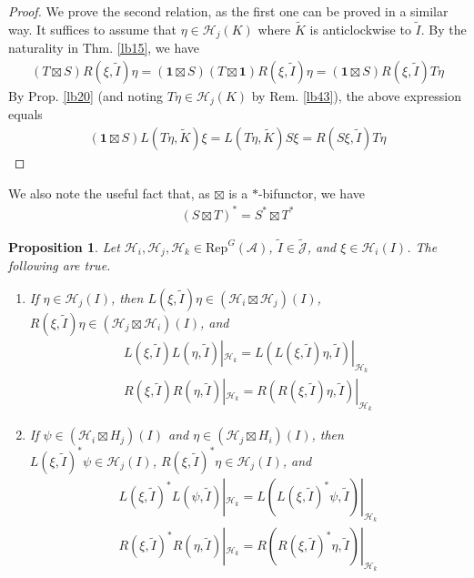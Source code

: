 \documentclass[11pt,b5paper,notitlepage]{article}
\theoremstyle{definition}
\theoremstyle{plain}
\newtheorem{pp}[df]{Proposition}
\newcommand{\mc}{\mathcal}
\newcommand{\wtd}{\widetilde}
\newcommand{\idt}{\mathbf{1}}
\newcommand{\RepGA}{\mathrm{Rep}^G(\mathcal A)}
\newcommand{\Jtd}{\widetilde{\mathcal J}}
\newcommand{\MH}{\mathcal H}
\numberwithin{equation}{section}
\begin{document}
\begin{proof}
We prove the second relation, as the first one can be proved in a similar way. It suffices to assume that $\eta\in\MH_j(K)$ where $\wtd K$ is anticlockwise to $\wtd I$. By the naturality in Thm. \ref{lb15}, we have
\begin{align*}
(T\boxtimes S)R(\xi,\wtd I)\eta=(\idt\boxtimes S)(T\boxtimes\idt)R(\xi,\wtd I)\eta=(\idt\boxtimes S)R(\xi,\wtd I)T\eta
\end{align*}
By Prop. \ref{lb20} (and noting $T\eta\in\MH_j(K)$ by Rem. \ref{lb43}), the above expression equals
\begin{align*}
(\idt\boxtimes S)L(T\eta,\wtd K)\xi=L(T\eta,\wtd K)S\xi=R(S\xi,\wtd I)T\eta
\end{align*}
\end{proof}


We also note the useful fact that, as $\boxtimes$ is a $*$-bifunctor, we have
\begin{align}\label{eq67}
(S\boxtimes T)^*=S^*\boxtimes T^*
\end{align}


\begin{pp}\label{lb21}
Let $\mc H_i,\mc H_j,\mc H_k\in\RepGA$, $\wtd I\in\Jtd$, and $\xi\in\mc H_i(I)$. The following are true.
\begin{enumerate}[label=(\alph*)]
\item If $\eta\in\mc H_j(I)$, then $L(\xi,\wtd I)\eta\in(\mc H_i\boxtimes\mc H_j)(I)$, $R(\xi,\wtd I)\eta\in(\mc H_j\boxtimes\mc H_i)(I)$, and
\begin{gather*}
L(\xi,\wtd I)L(\eta,\wtd I)|_{\mc H_k}=L(L(\xi,\wtd I)\eta,\wtd I)|_{\mc H_k}\\
R(\xi,\wtd I)R(\eta,\wtd I)|_{\mc H_k}=R(R(\xi,\wtd I)\eta,\wtd I)|_{\mc H_k}
\end{gather*}
\item If $\psi\in(\mc H_i\boxtimes H_j)(I)$ and $\eta\in (\mc H_j\boxtimes H_i)(I)$, then $L(\xi,\wtd I)^*\psi\in\mc H_j(I)$, $R(\xi,\wtd I)^*\eta\in\mc H_j(I)$, and
\begin{gather*}
L(\xi,\wtd I)^*L(\psi,\wtd I)|_{\mc H_k}=L(L(\xi,\wtd I)^*\psi,\wtd I)|_{\mc H_k}\\
 R(\xi,\wtd I)^*R(\eta,\wtd I)|_{\mc H_k}=R(R(\xi,\wtd I)^*\eta,\wtd I)|_{\mc H_k}
\end{gather*}
\end{enumerate} 
\end{pp}
\end{document}
